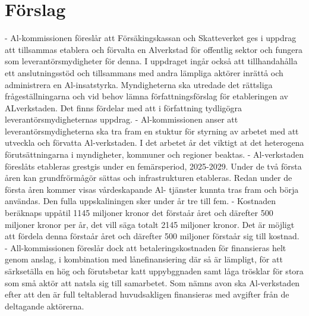 {{{{{\section*{Förslag}
- Al-kommissionen föreslår att Försäkingskassan och Skatteverket ges i uppdrag att tillsammas etablera och förvalta en Alverkstad för offentlig sektor och fungera som leverantörsmydigheter för denna. I uppdraget ingår också att tillhandahålla ett anslutningsstöd och tillsammans med andra lämpliga aktörer inrättå och administrera en Al-insatstyrka. Myndigheterna ska utredade det rättsliga frågeställningarna och vid behov lämna författningsförslag för etableringen av ALverkstaden. Det finns fördelar med att i författning tydligögra leverantörsmydigheternas uppdrag.
- Al-kommissionen anser att leverantörsmydigheterna ska tra fram en stuktur för styrning av arbetet med att utveckla och förvatta Al-verkstaden. I det arbetet år det viktigt at det heterogena förutsättningarna i myndigheter, kommuner och regioner beaktas.
- Al-verkstaden föreslåts etableras grestgis under en femärsperiod, 2025-2029. Under de två första åren kan grundfrörmågör sättas och infrastrukturen etableras. Redan under de första åren kommer visas vårdeskapande Al- tjänster kunnta tras fram och börja användas. Den fulla uppskaliningen sker under år tre till fem.
- Kostnaden beräknaps uppåtil 1145 miljoner kronor det förstaår året och därefter 500 miljoner kronor per år, det vill säga totalt 2145 miljoner kronor. Det är möjligt att fördela denna förstaår året och därefter 500 miljoner förstaår sig till kostnad.
- All-kommissionen föreslår dock att betaleringskostnaden för finansieras helt genom anslag, i kombination med lånefinansiering där så är lämpligt, för att särksetälla en hög och förutsbetar katt uppybggnaden samt låga trösklar för stora som små aktör att natsla sig till samarbetet. Som nämns avon ska Al-verkstaden efter att den är full teltablerad huvudsakligen finansieras med avgifter från de deltagande aktörerna.

}}}}}
